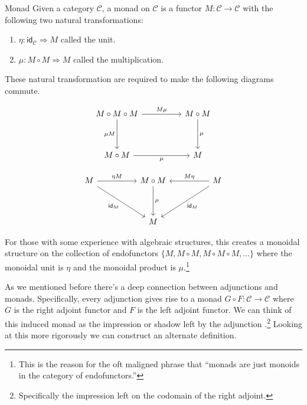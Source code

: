 \documentclass[12pt]{article}
\begin{document}
\begin{definition}{Monad}{}
    Given a category $\mathcal{C}$, a monad on $\mathcal{C}$ is a functor $M:\mathcal{C}\rightarrow\mathcal{C}$ with the following two natural transformations:
    \begin{enumerate}
        \item $\eta : \mathsf{id}_{\mathcal{C}} \Rightarrow M$ called the unit.
        \item $\mu: M\circ M \Rightarrow M$ called the multiplication.
    \end{enumerate}
    These natural transformation are required to make the following diagrams commute.

    \[\begin{tikzcd}
            M\circ M\circ M && M\circ M \\
            \\
            M\circ M && M
            \arrow["M\mu", from=1-1, to=1-3]
            \arrow["\mu", from=1-3, to=3-3]
            \arrow["\mu"', from=3-1, to=3-3]
            \arrow["{\mu M}"', from=1-1, to=3-1]
        \end{tikzcd}\]

    \[\begin{tikzcd}
            M && M\circ M && M \\
            \\
            && M
            \arrow["{\eta M}", from=1-1, to=1-3]
            \arrow["M\eta"', from=1-5, to=1-3]
            \arrow["\mu", from=1-3, to=3-3]
            \arrow["{\mathsf{id}_M}", from=1-5, to=3-3]
            \arrow["{\mathsf{id}_M}"', from=1-1, to=3-3]
        \end{tikzcd}\]

    For those with some experience with algebraic structures, this creates a monoidal structure on the collection of endofunctors $\{M, M\circ M, M\circ M\circ M,\dots\}$ where the monoidal unit is $\eta$ and the monoidal product is $\mu$.\footnote{This is the reason for the oft maligned phrase that ``monads are just monoids in the category of endofunctors.''}
\end{definition}

As we mentioned before there's a deep connection between adjunctions and monads.
Specifically, every adjunction gives rise to a monad $G \circ F: \mathcal{C} \rightarrow \mathcal{C}$ where $G$ is the right adjoint functor and $F$ is the left adjoint functor.
We can think of this induced monad as the impression or shadow left by the adjunction \cite{riehl2017category}.\footnote{Specifically the impression left on the codomain of the right adjoint.}
Looking at this more rigorously we can construct an alternate definition.
\end{document}
